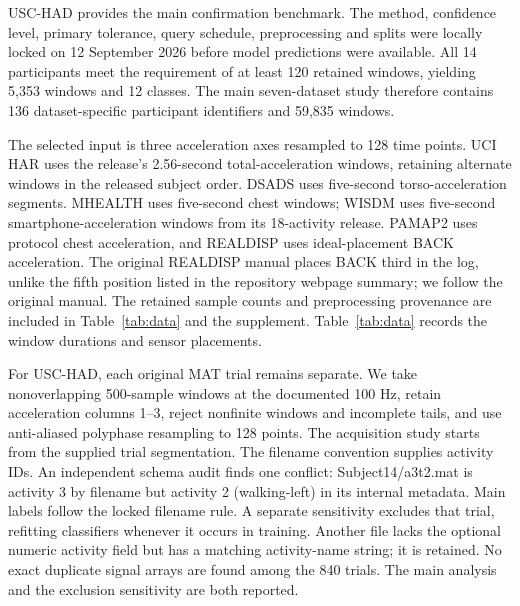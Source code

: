 \documentclass[preprint,12pt]{elsarticle}
\begin{document}
USC-HAD \cite{uschad} provides the main confirmation benchmark. The method, confidence level, primary tolerance, query schedule, preprocessing and splits were locally locked on 12 September 2026 before model predictions were available. All 14 participants meet the requirement of at least 120 retained windows, yielding 5,353 windows and 12 classes. The main seven-dataset study therefore contains 136 dataset-specific participant identifiers and 59,835 windows.

The selected input is three acceleration axes resampled to 128 time points. UCI HAR uses the release's 2.56-second total-acceleration windows, retaining alternate windows in the released subject order. DSADS uses five-second torso-acceleration segments. MHEALTH uses five-second chest windows; WISDM uses five-second smartphone-acceleration windows from its 18-activity release. PAMAP2 uses protocol chest acceleration, and REALDISP uses ideal-placement BACK acceleration. The original REALDISP manual places BACK third in the log, unlike the fifth position listed in the repository webpage summary; we follow the original manual. The retained sample counts and preprocessing provenance are included in Table~\ref{tab:data} and the supplement. Table~\ref{tab:data} records the window durations and sensor placements.

For USC-HAD, each original MAT trial remains separate. We take nonoverlapping 500-sample windows at the documented 100 Hz, retain acceleration columns 1--3, reject nonfinite windows and incomplete tails, and use anti-aliased polyphase resampling to 128 points. The acquisition study starts from the supplied trial segmentation. The filename convention supplies activity IDs. An independent schema audit finds one conflict: Subject14/a3t2.mat is activity 3 by filename but activity 2 (walking-left) in its internal metadata. Main labels follow the locked filename rule. A separate sensitivity excludes that trial, refitting classifiers whenever it occurs in training. Another file lacks the optional numeric activity field but has a matching activity-name string; it is retained. No exact duplicate signal arrays are found among the 840 trials. The main analysis and the exclusion sensitivity are both reported.
\end{document}
